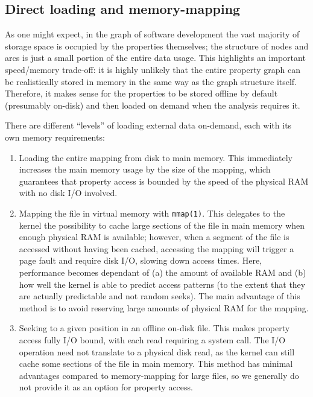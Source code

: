 \subsection{Direct loading and memory-mapping}

As one might expect, in the graph of software development the vast majority of
storage space is occupied by the properties themselves; the structure of nodes
and arcs is just a small portion of the entire data usage. This highlights an
important speed/memory trade-off: it is highly unlikely that the entire
property graph can be realistically stored in memory in the same way as the
graph structure itself. Therefore, it makes sense for the properties to be
stored offline by default (presumably on-disk) and then loaded on demand
when the analysis requires it.

There are different ``levels'' of loading external data on-demand, each with
its own memory requirements:

\begin{enumerate}
    \item Loading the entire mapping from disk to main memory. This immediately
        increases the main memory usage by the size of the mapping, which
        guarantees that property access is bounded by the speed of the physical
        RAM with no disk I/O involved.
    \item Mapping the file in virtual memory with \texttt{mmap(1)}. This
        delegates to the kernel the possibility to cache large sections of the
        file in main memory when enough physical RAM is available; however,
        when a segment of the file is accessed without having been cached,
        accessing the mapping will trigger a page fault and require disk I/O,
        slowing down access times.
        Here, performance becomes dependant of (a) the amount of available RAM
        and (b) how well the kernel is able to predict access patterns (to the
        extent that they are actually predictable and not random seeks).
        The main advantage of this method is to avoid reserving large amounts
        of physical RAM for the mapping.
    \item Seeking to a given position in an offline on-disk file. This makes
        property access fully I/O bound, with each read requiring a system
        call. The I/O operation need not translate to a physical disk read, as
        the kernel can still cache some sections of the file in main memory.
        This method has minimal advantages compared to memory-mapping for large
        files, so we generally do not provide it as an option for property
        access.
\end{enumerate}

